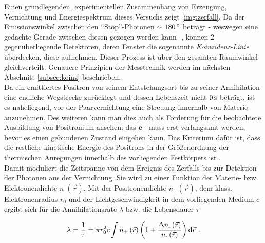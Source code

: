 \documentclass[numbers=noenddot,a4paper]{scrartcl}
\newcommand{\degree}{^\circ}
\newcommand{\diff}{\textnormal{d}}
\newcommand{\ix}[1]{_\text{#1}}
\newcommand{\tilt}[1]{\textit{#1}}
\begin{document}
			Einen grundlegenden, experimentellen Zusammenhang von Erzeugung, Vernichtung und Energiespektrum dieses Versuchs zeigt \ref{img:zerfall}. Da der Emissionswinkel zwischen den "`Stop"'-Photonen $\sim\unit[180]{\degree}$ beträgt - weswegen eine gedachte Gerade zwischen diesen gezogen werden kann -, können 2 gegenüberliegende Detektoren, deren Fenster die sogenannte \tilt{Koinzidenz-Linie} überdecken, diese aufnehmen. Dieser Prozess ist über den gesamten Raumwinkel gleichverteilt. Genauere Prinzipien der Messtechnik werden im nächsten Abschnitt \ref{subsec:koinz} beschrieben.\\
			Da ein emittiertes Positron von seinem Entstehungsort bis zu seiner Annihilation eine endliche Wegstrecke zurücklegt und dessen Lebenszeit nicht $\unit[0]{s}$ beträgt, ist es naheliegend, vor der Paarvernichtung eine Streuung innerhalb von Materie anzunehmen. Des weiteren kann man dies auch als Forderung für die beobachtete Ausbildung von Positronium ansehen: das $\textbf{e}^+$ muss erst verlangsamt werden, bevor es einen gebundenen Zustand eingehen kann. Das Kriterium dafür ist, dass die restliche kinetische Energie des Positrons in der Größenordnung der thermischen Anregungen innerhalb des vorliegenden Festkörpers ist \cite{Augsten08}.\\
			Damit moduliert die Zeitspanne von dem Ereignis des Zerfalls bis zur Detektion der Photonen aus der Vernichtung. Sie wird zu einer Funktion der Materie- bzw. Elektronendichte $n\ix{-}\left(\vec{r}\right)$. Mit der Positronendichte $n\ix{+}\left(\vec{r}\right)$, dem klass. Elektronenradius $r\ix{0}$ und der Lichtgeschwindigkeit in dem vorliegenden Medium $c$ ergibt sich für die Annihilationsrate $\lambda$ bzw. die Lebensdauer $\tau$

				\begin{align}
					\lambda=\frac{1}{\tau}=\pi r\ix{0}^{2}c\int n\ix{+}\left(\vec{r}\right)\left(1+\frac{\Delta n\ix{-}\left(\vec{r}\right)}{n\ix{-}\left(\vec{r}\right)}\right)\diff \vec{r} \,\, .
				\end{align}
\end{document}
